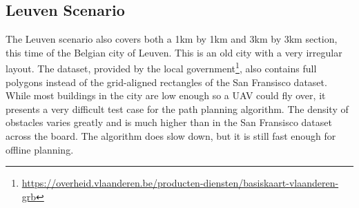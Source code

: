 \subsection{Leuven Scenario}
The Leuven scenario also covers both a 1km by 1km and 3km by 3km section, this time of the Belgian city of Leuven. This is an old city with a very irregular layout. The dataset, provided by the local government\footnote{\url{https://overheid.vlaanderen.be/producten-diensten/basiskaart-vlaanderen-grb}}, also contains full polygons instead of the grid-aligned rectangles of the San Fransisco dataset. While most buildings in the city are low enough so a UAV could fly over, it presents a very difficult test case for the path planning algorithm. The density of obstacles varies greatly and is much higher than in the San Fransisco dataset across the board. The algorithm does slow down, but it is still fast enough for offline planning.

